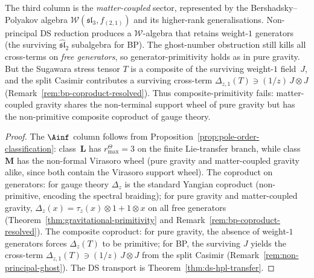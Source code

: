 \begin{corollary}
The third column is the \emph{matter-coupled} sector, represented
by the Bershadsky--Polyakov algebra
$\mathcal{W}(\mathfrak{sl}_3, f_{(2,1)})$ and its higher-rank
generalisations. Non-principal DS reduction produces a
$\mathcal{W}$-algebra that retains weight-$1$ generators
(the surviving $\widehat{\mathfrak{sl}}_2$ subalgebra for BP).
The ghost-number obstruction still kills all cross-terms on
\emph{free generators}, so generator-primitivity holds as in
pure gravity. But the Sugawara stress tensor $T$ is a composite
of the surviving weight-$1$ field~$J$, and the split Casimir
contributes a surviving cross-term
$\Delta_{z,1}(T) \ni (1/z)\, J \otimes J$
(Remark~\ref{rem:bp-coproduct-resolved}). Thus composite-primitivity
fails: matter-coupled gravity shares the non-terminal support wheel
of pure gravity but has the non-primitive composite coproduct
of gauge theory.
\end{corollary}

\begin{proof}
The $\Ainf$ column follows from
Proposition~\ref{prop:pole-order-classification}: class~$\mathbf{L}$
has \(r^\Theta_{\max}=3\) on the finite Lie-transfer branch, while
class~$\mathbf{M}$ has the
non-formal Virasoro wheel (pure gravity and matter-coupled gravity
alike, since both contain the Virasoro support wheel).
The coproduct on generators: for gauge theory $\Delta_z$ is the
standard Yangian coproduct (non-primitive, encoding the spectral
braiding); for pure gravity and matter-coupled gravity,
$\Delta_z(x) = \tau_z(x) \otimes 1 + 1 \otimes x$ on all free
generators (Theorem~\ref{thm:gravitational-primitivity} and
Remark~\ref{rem:bp-coproduct-resolved}). The composite coproduct:
for pure gravity, the absence of weight-$1$ generators forces
$\Delta_z(T)$ to be primitive; for BP, the surviving
$J$ yields the cross-term
$\Delta_{z,1}(T) \ni (1/z)\, J \otimes J$ from the split
Casimir (Remark~\ref{rem:non-principal-ghost}). The DS transport
is Theorem~\ref{thm:ds-hpl-transfer}.
\end{proof}

